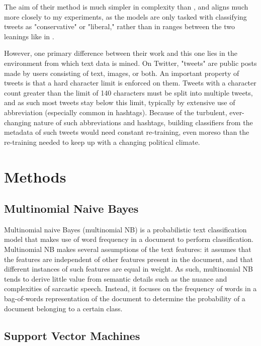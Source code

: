 \documentclass[11pt,a4paper]{article}
\begin{document}
The aim of their method is much simpler in complexity than \cite{reddit-stance}, and aligns much more closely to my experiments, as the models are only tasked with classifying tweets as "conservative" or "liberal," rather than in ranges between the two leanings like in \cite{reddit-stance}.

However, one primary difference between their work and this one lies in the environment from which text data is mined. On Twitter, "tweets" are public posts made by users consisting of text, images, or both. An important property of tweets is that a hard character limit is enforced on them. Tweets with a character count greater than the limit of 140 characters must be split into multiple tweets, and as such most tweets stay below this limit, typically by extensive use of abbreviation (especially common in hashtags). Because of the turbulent, ever-changing nature of such abbreviations and hashtags, building classifiers from the metadata of such tweets would need constant re-training, even moreso than the re-training needed to keep up with a changing political climate.

\section{Methods}
\label{sec:length}

\subsection{Multinomial Naive Bayes}

Multinomial naive Bayes (multinomial NB) is a probabilistic text classification model that makes use of word frequency in a document to perform classification. Multinomial NB makes several assumptions of the text features: it assumes that the features are independent of other features present in the document, and that different instances of such features are equal in weight. As such, multinomial NB tends to derive little value from semantic details such as the nuance and complexities of sarcastic speech. Instead, it focuses on the frequency of words in a bag-of-words representation \cite{bag-of-words} of the document to determine the probability of a document belonging to a certain class.

\subsection{Support Vector Machines}
\end{document}
